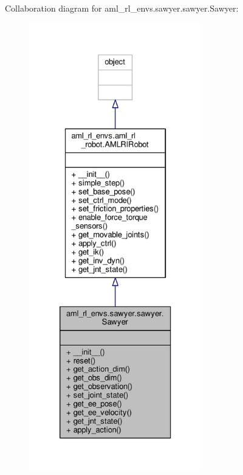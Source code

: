 Collaboration diagram for aml\-\_\-rl\-\_\-envs.\-sawyer.\-sawyer.\-Sawyer\-:
\nopagebreak
\begin{figure}[H]
\begin{center}
\leavevmode
\includegraphics[height=550pt]{classaml__rl__envs_1_1sawyer_1_1sawyer_1_1_sawyer__coll__graph}
\end{center}
\end{figure}
